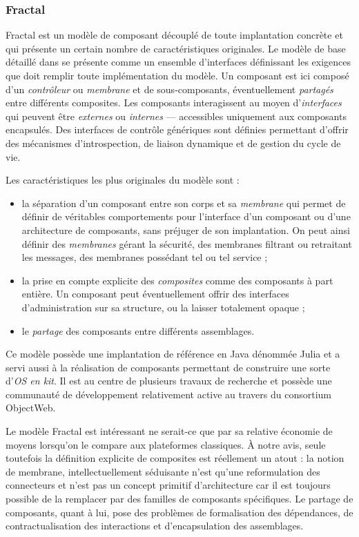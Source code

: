 \subsubsection{Fractal}
\label{sec:fractal}
Fractal est un mod\`ele de composant d\'ecoupl\'e de toute
implantation concr\`ete et qui pr\'esente un certain nombre de
caract\'eristiques originales. Le mod\`ele de base d\'etaill\'e
dans \cite{fractal-spec} se pr\'esente comme un ensemble
d'interfaces  d\'efinissant les exigences 
que doit remplir toute impl\'ementation du mod\`ele. Un composant
est ici compos\'e d'un \emph{contr\^oleur} ou  \emph{membrane} et de
sous-composants, \'eventuellement \emph{partag\'es} entre diff\'erents
composites. Les composants interagissent au moyen d'\emph{interfaces}
qui peuvent \^etre \emph{externes} ou \emph{internes} --- accessibles
uniquement aux composants encapsul\'es. Des interfaces de contr\^ole
g\'en\'eriques sont d\'efinies permettant d'offrir des
m\'ecanismes d'introspection, de liaison dynamique et de gestion du
cycle de vie.

Les caract\'eristiques les plus originales du mod\`ele sont : 
\begin{itemize}
  \item la s\'eparation d'un composant entre son corps et sa
    \emph{membrane} qui permet
    de d\'efinir de v\'eritables comportements pour l'interface d'un
    composant ou d'une architecture de composants, sans pr\'ejuger de
    son implantation. On peut ainsi d\'efinir des \emph{membranes}
    g\'erant la s\'ecurit\'e, des membranes filtrant ou retraitant
    les messages, des membranes poss\'edant tel ou tel
    service ;
  \item la prise en compte explicite des \emph{composites} comme des
    composants \`a part enti\`ere. Un composant peut
    \'eventuellement offrir des interfaces d'administration sur sa
    structure, ou la laisser totalement opaque ;
  \item le \emph{partage} des composants entre diff\'erents assemblages.
\end{itemize}

Ce mod\`ele poss\`ede une implantation de r\'ef\'erence en
\textsf{Java} d\'enomm\'ee \textsf{Julia} et a servi aussi \`a la
r\'ealisation de composants permettant de construire une sorte d'\emph{OS
en kit}. Il est au centre de plusieurs travaux de recherche et
poss\`ede une communaut\'e de d\'eveloppement relativement
active au travers du consortium \textsf{ObjectWeb}.

Le mod\`ele \textsf{Fractal} est int\'eressant ne serait-ce que par sa
relative \'economie de moyens lorsqu'on le compare aux plateformes
classiques. \`A notre avis, seule toutefois la d\'efinition explicite
de composites est r\'eellement un atout : la notion de membrane,
intellectuellement s\'eduisante n'est qu'une reformulation des
connecteurs et n'est pas un concept primitif d'architecture car il est
toujours possible de la remplacer par des familles de composants
sp\'ecifiques. Le partage de composants, quant \`a lui, pose des
probl\`emes de formalisation des d\'ependances, de
contractualisation des interactions et d'encapsulation des assemblages.

